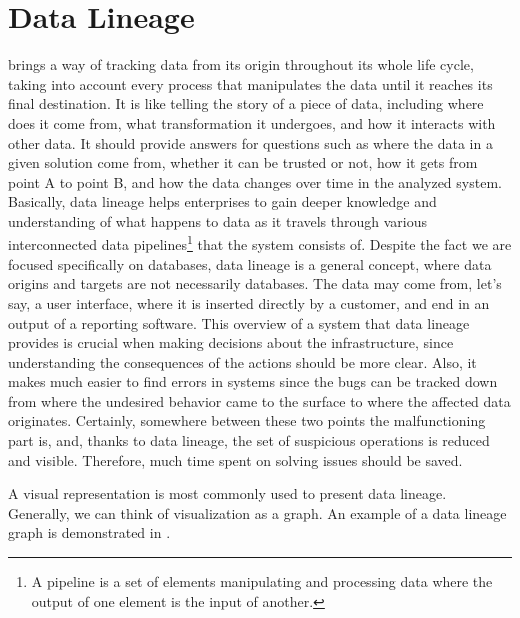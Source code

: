 \section{Data Lineage}

 brings a way of tracking data from its origin throughout its whole life cycle, taking into account every process that manipulates the data until it reaches its final destination. 
It is like telling the story of a piece of data, including where does it come from, what transformation it undergoes, and how it interacts with other data.
It should provide answers for questions such as where the data in a given solution come from, whether it can be trusted or not, how it gets from point A to point B, and how the data changes over time in the analyzed system.
Basically, data lineage helps enterprises to gain deeper knowledge and understanding of what happens to data as it travels through various interconnected data pipelines\footnote{A pipeline is a set of elements manipulating and processing data where the output of one element is the input of another.} that the system consists of. Despite the fact we are focused specifically on databases, data lineage is a general concept, where data origins and targets are not necessarily databases. The data may come from, let's say, a user interface, where it is inserted directly by a customer, and end in an output of a reporting software.
This overview of a system that data lineage provides is crucial when making decisions about the infrastructure, since understanding the consequences of the actions should be more clear. Also, it makes much easier to find errors in systems since the bugs can be tracked down from where the undesired behavior came to the surface to where the affected data originates. 
Certainly, somewhere between these two points the malfunctioning part is, and, thanks to data lineage, the set of suspicious operations is reduced and visible. 
Therefore, much time spent on solving issues should be saved.

A visual representation is most commonly used to present data lineage. 
Generally, we can think of visualization as a graph. An example of a data lineage graph is demonstrated in .


